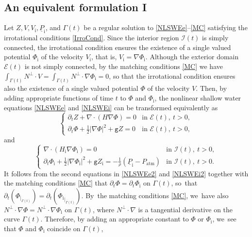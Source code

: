 \documentclass[10pt]{amsart}
\newcommand{\gr}{{\mathtt g}}
\newcommand{\dt}{\partial_t}
\newcommand{\cI}{{\mathcal I}}
\newcommand{\cE}{{\mathcal E}}
\newcommand{\ul}[1]{\underline{#1}}
\newcommand{\itGamma}{\mathit{\Gamma}}
\theoremstyle{definition}
\begin{document}
\subsection{An equivalent formulation I}\label{subsect:EF1}
Let $Z,V,V_\mathrm{i},\ul{P}_\mathrm{i}$, and $\itGamma(t)$ be a regular solution to \eqref{NLSWEe}--\eqref{MC} satisfying the irrotational conditions \eqref{IrroCond}.
Since the interior region $\cI(t)$ is simply connected, the irrotational condition ensures the existence of a single valued potential $\Phi_\mathrm{i}$
of the velocity $V_\mathrm{i}$, that is, $V_\mathrm{i}=\nabla\Phi_\mathrm{i}$.
Although the exterior domain $\cE(t)$ is not simply connected, by the matching conditions \eqref{MC} we have
$\int_{\itGamma(t)}N^\perp\cdot V=\int_{\itGamma(t)}N^\perp\cdot\nabla\Phi_\mathrm{i}=0$,
so that the irrotational condition ensures also the existence of a single valued potential $\Phi$ of the velocity $V$.
Then, by adding appropriate functions of time $t$ to $\Phi$ and $\Phi_\mathrm{i}$,
the nonlinear shallow water equations \eqref{NLSWEe} and \eqref{NLSWEi} can be transformed equivalently as
\begin{equation}\label{NLSWEe2}
\begin{cases}
\dt Z+\nabla\cdot(H\nabla\Phi)=0 &\text{in } \cE(t), \ t>0, \\
\dt\Phi + \frac12|\nabla\Phi|^2 + \gr Z = 0 &\text{in } \cE(t), \ t>0,
\end{cases}
\end{equation}
and
\begin{equation}\label{NLSWEi2}
\begin{cases}
\nabla\cdot(H_\mathrm{i}\nabla\Phi_\mathrm{i})=0 &\text{in } \cI(t), \ t>0, \\
\dt\Phi_\mathrm{i} + \frac12|\nabla\Phi_\mathrm{i}|^2 + \gr Z_\mathrm{i} = -\frac{1}{\rho}(\ul{P}_\mathrm{i}-P_\mathrm{atm}) &\text{in } \cI(t), \ t>0.
\end{cases}
\end{equation}
It follows from the second equations in \eqref{NLSWEe2} and \eqref{NLSWEi2} together with the matching conditions \eqref{MC} that
$\dt\Phi=\dt\Phi_\mathrm{i}$ on $\itGamma(t)$, so~that $\dt(\Phi_{\vert_{\itGamma(t)}})=\dt({ \Phi_\mathrm{i} }_{\vert_{\itGamma(t)}})$. By~the matching conditions \eqref{MC}, we~have also $N^\perp\cdot\nabla\Phi=N^\perp\cdot\nabla\Phi_\mathrm{i}$ on $\itGamma(t)$,
where $N^\perp\cdot\nabla$ is a tangential derivative on the curve $\itGamma(t)$.
Therefore, by adding an appropriate constant to $\Phi$ or $\Phi_\mathrm{i}$, we~see that $\Phi$ and $\Phi_\mathrm{i}$ coincide on $\itGamma(t)$,
\end{document}
